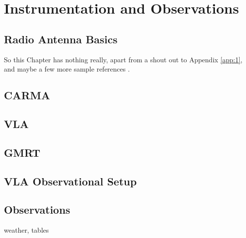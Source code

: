 

\chapter{Instrumentation and Observations} 
\label{chap:2}

\section{Radio Antenna Basics}\label{sec:1}
So this Chapter has nothing really, apart from a shout out to Appendix \ref{app:1}, and maybe a few more sample references \citep{harper_2006, seaquist_taylor_1990}.

\section{CARMA}\label{sec:2}

\section{VLA}\label{sec:3}

\section{GMRT}\label{sec:4}

\section{VLA Observational Setup}\label{sec:5}

\section{Observations}\label{sec:6}
weather, tables